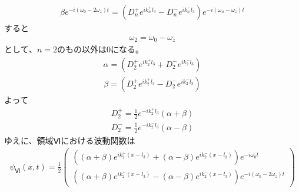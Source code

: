 \begin{align}
{\beta}e^{-i(\omega_{0}-2\omega_{z})t}=\left(D_{n}^{+}e^{ik_{n}^{+}l_{3}}-D_{n}^{-}e^{ik_{n}^{-}l_{3}}\right)e^{-i\left(\omega_{n}-\omega_{z}\right)t}
\end{align}
すると
\begin{align}
\omega_{2}=\omega_{0}-\omega_{z}
\end{align}
$として、n=2のもの以外は0になる。$
\begin{align}
{\alpha}=\left(D_{2}^{+}e^{ik_{2}^{+}l_{3}}+D_{2}^{-}e^{ik_{2}^{-}l_{3}}\right)
\end{align}
\begin{align}
{\beta}=\left(D_{2}^{+}e^{ik_{2}^{+}l_{3}}-D_{2}^{-}e^{ik_{2}^{-}l_{3}}\right)
\end{align}
よって
\begin{align}
D_{2}^{+}=\frac{1}{2}e^{-ik_{2}^{+}l_{3}}({\alpha}+{\beta})
\end{align}
\begin{align}
D_{2}^{-}=\frac{1}{2}e^{-ik_{2}^{-}l_{3}}({\alpha}-{\beta})
\end{align}
ゆえに、領域Ⅵにおける波動関数は
\begin{align}
{\psi}_{Ⅵ}(x,t)=\frac{1}{2}
\begin{pmatrix}
\left(({\alpha}+{\beta})e^{ik_{2}^{+}(x-l_{3})}+({\alpha}-{\beta})e^{ik_{2}^{-}(x-l_{3})}\right)e^{-i\omega_{0}t}\\
\left(({\alpha}+{\beta})e^{ik_{2}^{+}(x-l_{3})}-({\alpha}-{\beta})e^{ik_{2}^{-}(x-l_{3})}\right)e^{-i(\omega_{0}-2\omega_{z})t}
\end{pmatrix}
\end{align}

